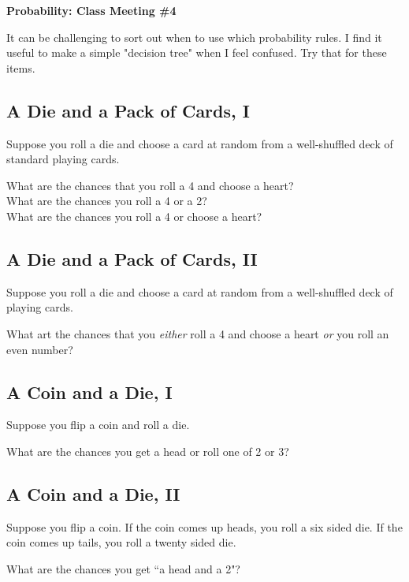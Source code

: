 \documentclass[12pt]{amsart}
\theoremstyle{definition}
\begin{document}
\begin{center}
\textbf{\Huge
Probability: Class Meeting \#4
}
\end{center}
\vspace{.5in}

It can be challenging to sort out when to use which probability rules. I find it useful to make a simple "decision tree" when I feel confused. Try that for these items.

\subsection*{A Die and a Pack of Cards, I}
Suppose you roll a die and choose a card at random from a well-shuffled deck of standard playing cards.

What are the chances that you roll a 4 and choose a heart?\\

What are the chances you roll a 4 or a 2?\\

What are the chances you roll a 4 or choose a heart?\\

\subsection*{A Die and a Pack of Cards, II} Suppose you roll a die and choose a card at random from a well-shuffled deck of playing cards. 

What art the chances that you \emph{either} roll a 4 and choose a heart \emph{or} you roll an even number?\\

\subsection*{A Coin and a Die, I} Suppose you flip a coin and roll a die. 

What are the chances you get a head or roll one of 2 or 3?\\

\subsection*{A Coin and a Die, II} Suppose you flip a coin. If the coin comes up heads, you roll a six sided die. If the coin comes up tails, you roll a twenty sided die.

What are the chances you get ``a head and a 2"?\\
\end{document}
